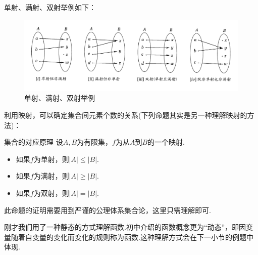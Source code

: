 \documentclass[lang=cn, zihao=5]{elegantbook}
\begin{document}
单射、满射、双射举例如下：

\begin{figure}[h!]
	\centering
	\includegraphics[width=17cm]{attachment/20230403teuuykue.pdf}
	\caption{单射、满射、双射举例}
\end{figure}

利用映射，可以确定集合间元素个数的关系(下列命题其实是另一种理解映射的方法)：

\begin{proposition}{集合的对应原理}
	设$A,B$为有限集，$f$为从$A$到$B$的一个映射. 
	\begin{itemize}
		\item 如果$f$为单射，则$|A| \leq |B|$. 
		\item 如果$f$为满射，则$|A| \geq |B|$. 
		\item 如果$f$为双射，则$|A| = |B|$. 
	\end{itemize}
\end{proposition}
\begin{remark}
	此命题的证明需要用到严谨的公理体系集合论，这里只需理解即可.
\end{remark}

刚才我们用了一种静态的方式理解函数.初中介绍的函数概念更为“动态”，即因变量随着自变量的变化而变化的规则称为函数.这种理解方式会在下一小节的例题中体现.
\end{document}
